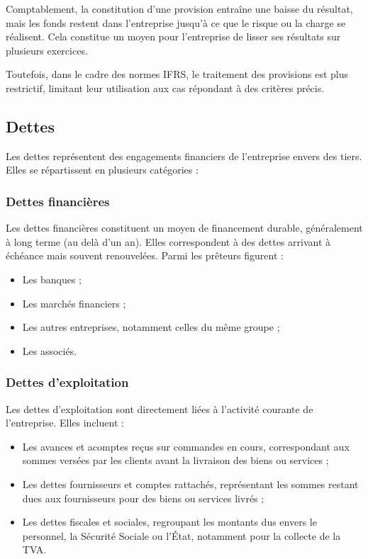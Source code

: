 \documentclass[a4paper, 12pt]{report}
\begin{document}
Comptablement, la constitution d'une provision entraîne une baisse du résultat, mais les fonds restent dans l’entreprise jusqu’à ce que le risque ou la charge se réalisent. Cela constitue un moyen pour l’entreprise de lisser ses résultats sur plusieurs exercices.

Toutefois, dans le cadre des normes IFRS, le traitement des provisions est plus restrictif, limitant leur utilisation aux cas répondant à des critères précis.

\subsection{Dettes}

Les dettes représentent des engagements financiers de l’entreprise envers des tiers. Elles se répartissent en plusieurs catégories :

\subsubsection{Dettes financières}

Les dettes financières constituent un moyen de financement durable, généralement à long terme (au delà d'un an). Elles correspondent à des dettes arrivant à échéance mais souvent renouvelées. Parmi les prêteurs figurent :  
\begin{itemize}
	\item Les banques ;  
	\item Les marchés financiers ;  
	\item Les autres entreprises, notamment celles du même groupe ;  
	\item Les associés.
\end{itemize}  

\subsubsection{Dettes d'exploitation}

Les dettes d’exploitation sont directement liées à l’activité courante de l’entreprise. Elles incluent :  
\begin{itemize}
	\item Les avances et acomptes reçus sur commandes en cours, correspondant aux sommes versées par les clients avant la livraison des biens ou services ;  
	\item Les dettes fournisseurs et comptes rattachés, représentant les sommes restant dues aux fournisseurs pour des biens ou services livrés ;  
	\item Les dettes fiscales et sociales, regroupant les montants dus envers le personnel, la Sécurité Sociale ou l'État, notamment pour la collecte de la TVA.
\end{itemize}
\end{document}
